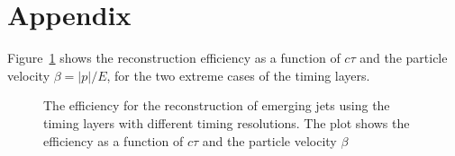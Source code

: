 \section{Appendix}
\label{appendix}

Figure~\ref{fig:efficiency_beta} shows the reconstruction
efficiency as a function of $c\tau$ and the  particle velocity  $\beta=|p|/E$, for the two extreme
cases of the timing layers.

\begin{figure}
\begin{center}

\end{center}
\caption{
The efficiency for the reconstruction of emerging jets using the timing layers with different timing resolutions.
The plot shows the efficiency as a function of $c\tau$ and the  particle velocity $\beta$
}
\label{fig:efficiency_beta}
\end{figure}

